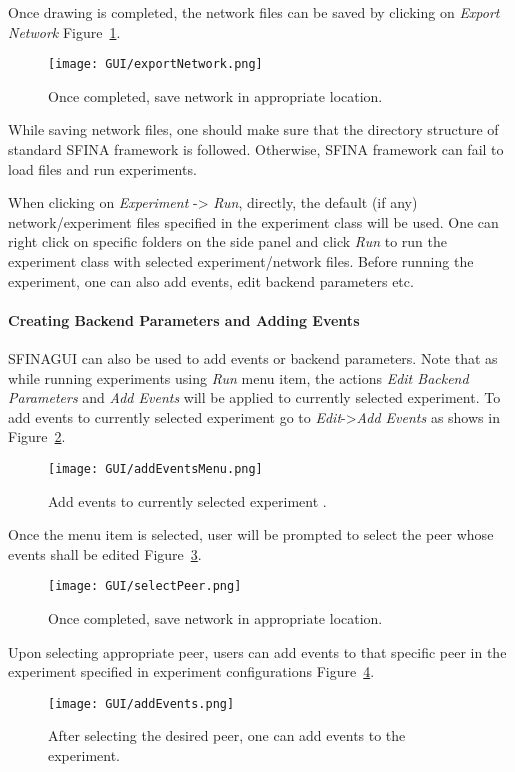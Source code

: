 \documentclass[11pt,fleqn]{book} %
\begin{document}
Once drawing is completed, the network files can be saved by clicking on \textit{Export Network} Figure~\ref{fig:exportnetwork}. 

\begin{figure}[H]
	\centering
	\texttt{[image: GUI/exportNetwork.png]}
	\caption{Once completed, save network in appropriate location.}\label{fig:exportnetwork}
\end{figure}

While saving network files, one should make sure that the directory structure of standard SFINA framework is followed. Otherwise, SFINA framework can fail to load files and run experiments.

When clicking on \textit{Experiment} -> \textit{Run}, directly, the default (if any) network/experiment files specified in the experiment class will be used. One can right click on specific folders on the side panel and click \textit{Run} to run the experiment class with selected experiment/network files. Before running the experiment, one can also add events, edit backend parameters etc.

\paragraph{Creating Backend Parameters and Adding Events}
SFINAGUI can also be used to add events or backend parameters. Note that as while running experiments using \textit{Run} menu item, the actions \textit{Edit Backend Parameters} and \textit{Add Events} will be applied to currently selected experiment. To add events to currently selected experiment go to \textit{Edit}->\textit{Add Events} as shows in Figure~\ref{fig:addeventsmenu}.
\begin{figure}[H]
	\centering
	\texttt{[image: GUI/addEventsMenu.png]}
	\caption{Add events to currently selected experiment .}\label{fig:addeventsmenu}
\end{figure}
Once the menu item is selected, user will be prompted to select the peer whose events shall be edited Figure~\ref{fig:selectpeer}.
\begin{figure}[h]
	\centering
	\texttt{[image: GUI/selectPeer.png]}
	\caption{Once completed, save network in appropriate location.}\label{fig:selectpeer}
\end{figure}
Upon selecting appropriate peer, users can add events to that specific peer in the experiment specified in experiment configurations Figure~\ref{fig:addevents}. 
\begin{figure}[H]
	\centering
	\texttt{[image: GUI/addEvents.png]}
	\caption{After selecting the desired peer, one can add events to the experiment.}\label{fig:addevents}
\end{figure}
\end{document}
